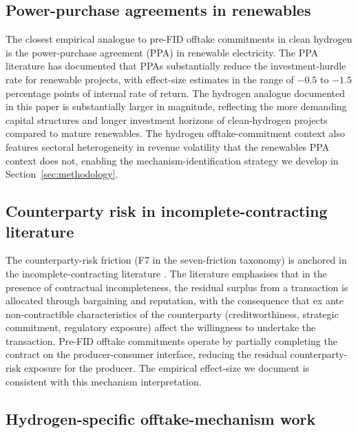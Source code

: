 \documentclass[12pt,a4paper]{article}
\theoremstyle{plain}
\theoremstyle{definition}
\begin{document}
\subsection{Power-purchase agreements in renewables}
\label{sec:lit-ppa}

The closest empirical analogue to pre-FID offtake commitments in clean hydrogen is the power-purchase agreement (PPA) in renewable electricity. The PPA literature \cite{barradale2014investing, lloyd2022maritime, ricks2023minimizing} has documented that PPAs substantially reduce the investment-hurdle rate for renewable projects, with effect-size estimates in the range of $-0.5$ to $-1.5$ percentage points of internal rate of return. The hydrogen analogue documented in this paper is substantially larger in magnitude, reflecting the more demanding capital structures and longer investment horizons of clean-hydrogen projects compared to mature renewables. The hydrogen offtake-commitment context also features sectoral heterogeneity in revenue volatility that the renewables PPA context does not, enabling the mechanism-identification strategy we develop in Section~\ref{sec:methodology}.

\subsection{Counterparty risk in incomplete-contracting literature}
\label{sec:lit-counterparty}

The counterparty-risk friction (F7 in the seven-friction taxonomy) is anchored in the incomplete-contracting literature \cite{holmstrom1991multitask}. The literature emphasises that in the presence of contractual incompleteness, the residual surplus from a transaction is allocated through bargaining and reputation, with the consequence that ex ante non-contractible characteristics of the counterparty (creditworthiness, strategic commitment, regulatory exposure) affect the willingness to undertake the transaction. Pre-FID offtake commitments operate by partially completing the contract on the producer-consumer interface, reducing the residual counterparty-risk exposure for the producer. The empirical effect-size we document is consistent with this mechanism interpretation.

\subsection{Hydrogen-specific offtake-mechanism work}
\label{sec:lit-hydrogen-offtake}
\end{document}
